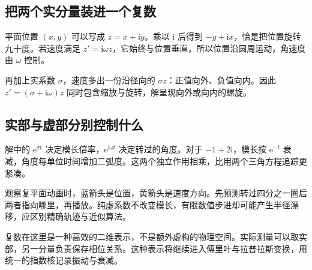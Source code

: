 \subsection*{把两个实分量装进一个复数}
平面位置 $(x,y)$ 可以写成 $z=x+\mathrm i y$。乘以 $\mathrm i$ 后得到 $-y+\mathrm i x$，恰是把位置旋转九十度。若速度满足 $z'=\mathrm i\omega z$，它始终与位置垂直，所以位置沿圆周运动，角速度由 $\omega$ 控制。

再加上实系数 $\sigma$，速度多出一份沿径向的 $\sigma z$：正值向外、负值向内。因此 $z'=(\sigma+\mathrm i\omega)z$ 同时包含缩放与旋转，解呈现向外或向内的螺旋。

\subsection*{实部与虚部分别控制什么}
解中的 $\mathrm e^{\sigma t}$ 决定模长倍率，$\mathrm e^{\mathrm i\omega t}$ 决定转过的角度。对于 $-1+2\mathrm i$，模长按 $\mathrm e^{-t}$ 衰减，角度每单位时间增加二弧度。这两个独立作用相乘，比用两个三角方程追踪更紧凑。

观察复平面动画时，蓝箭头是位置，黄箭头是速度方向。先预测转过四分之一圈后两者指向哪里，再播放。纯虚系数不改变模长，有限数值步进却可能产生半径漂移，应区别精确轨迹与近似算法。

复数在这里是一种高效的二维表示，不是额外虚构的物理空间。实际测量可以取实部，另一分量负责保存相位关系。这种表示将继续进入傅里叶与拉普拉斯变换，用统一的指数核记录振动与衰减。
